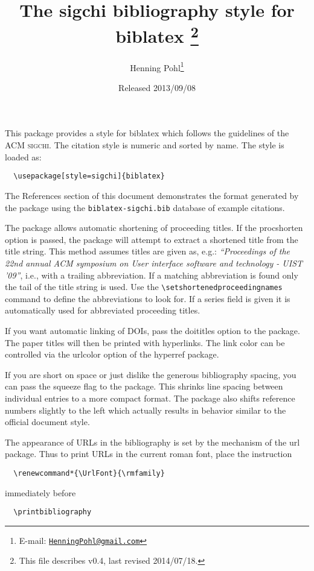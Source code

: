 \documentclass[a4paper]{ltxdoc}
\author{Henning Pohl\thanks{E-mail: 
  \href{mailto:HenningPohl@gmail.com}
  {\texttt{HenningPohl@gmail.com}}}}
\title{The \textsf{sigchi} bibliography style for \textsf{biblatex}%
  \footnote{This file describes v0.4, last revised 2014/07/18.}}
\date{Released 2013/09/08}
\begin{document}
\maketitle

This package provides a style for \textsf{biblatex} which follows the
guidelines of the \textsc{ACM sigchi}.
The citation style is numeric and sorted by name.
The style is loaded as:
\begin{verbatim}
  \usepackage[style=sigchi]{biblatex}
\end{verbatim}
The References section of this document demonstrates the format 
generated by the package using the \texttt{biblatex-sigchi.bib} database
of example citations.

The package allows automatic shortening of proceeding titles.
If the \textsf{procshorten} option is passed, the package will attempt to extract a shortened title from the title string.
This method assumes titles are given as, e.g.: \textit{``Proceedings of the 22nd annual ACM symposium on User interface software and technology - UIST '09''}, i.e., with a trailing abbreviation.
If a matching abbreviation is found only the tail of the title string is used.
Use the \verb|\setshortenedproceedingnames| command to define the abbreviations to look for.
If a \textsf{series} field is given it is automatically used for abbreviated proceeding titles.

If you want automatic linking of \textsf{DOIs}, pass the \textsf{doititles} option to the package.
The paper titles will then be printed with hyperlinks.
The link color can be controlled via the \textsf{urlcolor} option of the \textsf{hyperref} package.

If you are short on space or just dislike the generous bibliography spacing, you can pass the \textsf{squeeze} flag to the package.
This shrinks line spacing between individual entries to a more compact format.
The package also shifts reference numbers slightly to the left which actually results in behavior similar to the official document style.

The appearance of URLs in the bibliography is set by the mechanism of the
\textsf{url} package.
Thus to print URLs in the current roman font,
place the instruction
\begin{verbatim}
  \renewcommand*{\UrlFont}{\rmfamily}
\end{verbatim}
immediately before
\begin{verbatim}
  \printbibliography
\end{verbatim}
\end{document}

